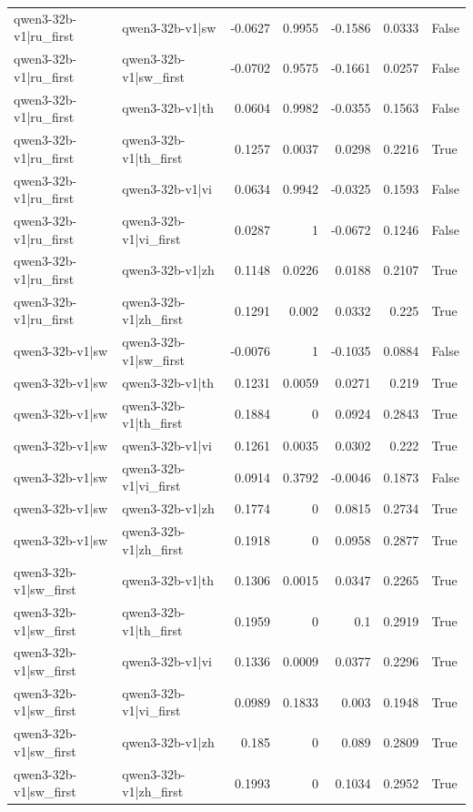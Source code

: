 \begin{table}
\begin{tabular}{l l r r r r l}
qwen3-32b-v1|ru_first & qwen3-32b-v1|sw & -0.0627 & 0.9955 & -0.1586 & 0.0333 & False \\
qwen3-32b-v1|ru_first & qwen3-32b-v1|sw_first & -0.0702 & 0.9575 & -0.1661 & 0.0257 & False \\
qwen3-32b-v1|ru_first & qwen3-32b-v1|th & 0.0604 & 0.9982 & -0.0355 & 0.1563 & False \\
qwen3-32b-v1|ru_first & qwen3-32b-v1|th_first & 0.1257 & 0.0037 & 0.0298 & 0.2216 & True \\
qwen3-32b-v1|ru_first & qwen3-32b-v1|vi & 0.0634 & 0.9942 & -0.0325 & 0.1593 & False \\
qwen3-32b-v1|ru_first & qwen3-32b-v1|vi_first & 0.0287 & 1 & -0.0672 & 0.1246 & False \\
qwen3-32b-v1|ru_first & qwen3-32b-v1|zh & 0.1148 & 0.0226 & 0.0188 & 0.2107 & True \\
qwen3-32b-v1|ru_first & qwen3-32b-v1|zh_first & 0.1291 & 0.002 & 0.0332 & 0.225 & True \\
qwen3-32b-v1|sw & qwen3-32b-v1|sw_first & -0.0076 & 1 & -0.1035 & 0.0884 & False \\
qwen3-32b-v1|sw & qwen3-32b-v1|th & 0.1231 & 0.0059 & 0.0271 & 0.219 & True \\
qwen3-32b-v1|sw & qwen3-32b-v1|th_first & 0.1884 & 0 & 0.0924 & 0.2843 & True \\
qwen3-32b-v1|sw & qwen3-32b-v1|vi & 0.1261 & 0.0035 & 0.0302 & 0.222 & True \\
qwen3-32b-v1|sw & qwen3-32b-v1|vi_first & 0.0914 & 0.3792 & -0.0046 & 0.1873 & False \\
qwen3-32b-v1|sw & qwen3-32b-v1|zh & 0.1774 & 0 & 0.0815 & 0.2734 & True \\
qwen3-32b-v1|sw & qwen3-32b-v1|zh_first & 0.1918 & 0 & 0.0958 & 0.2877 & True \\
qwen3-32b-v1|sw_first & qwen3-32b-v1|th & 0.1306 & 0.0015 & 0.0347 & 0.2265 & True \\
qwen3-32b-v1|sw_first & qwen3-32b-v1|th_first & 0.1959 & 0 & 0.1 & 0.2919 & True \\
qwen3-32b-v1|sw_first & qwen3-32b-v1|vi & 0.1336 & 0.0009 & 0.0377 & 0.2296 & True \\
qwen3-32b-v1|sw_first & qwen3-32b-v1|vi_first & 0.0989 & 0.1833 & 0.003 & 0.1948 & True \\
qwen3-32b-v1|sw_first & qwen3-32b-v1|zh & 0.185 & 0 & 0.089 & 0.2809 & True \\
qwen3-32b-v1|sw_first & qwen3-32b-v1|zh_first & 0.1993 & 0 & 0.1034 & 0.2952 & True \\

\end{tabular}
\end{table}
